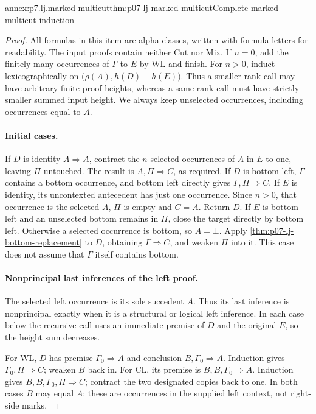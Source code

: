 \begin{annexitem}{annex:p7.lj.marked-multicut}{thm:p07-lj-marked-multicut}{Complete marked-multicut induction}
\begin{proof}
All formulas in this item are alpha-classes, written with formula letters
for readability.  The input proofs contain neither Cut nor Mix.  If
\(n=0\), add the finitely many occurrences of \(\Gamma\) to \(E\)
by WL and finish.  For \(n>0\), induct lexicographically on
\(\bigl(\rho(A),h(D)+h(E)\bigr)\).  Thus a smaller-rank call may
have arbitrary finite proof heights, whereas a same-rank call must have
strictly smaller summed input height.  We always keep unselected
occurrences, including occurrences equal to \(A\).

\paragraph{Initial cases.}
If \(D\) is identity \(A\Rightarrow A\), contract the \(n\)
selected occurrences of \(A\) in \(E\) to one, leaving \(\Pi\)
untouched.  The result is \(A,\Pi\Rightarrow C\), as required.
If \(D\) is bottom left, \(\Gamma\) contains a bottom occurrence,
and bottom left directly gives \(\Gamma,\Pi\Rightarrow C\).
If \(E\) is identity, its uncontexted antecedent has just one
occurrence.  Since \(n>0\), that occurrence is the selected \(A\),
\(\Pi\) is empty and \(C=A\).  Return \(D\).
If \(E\) is bottom left and an unselected bottom remains in
\(\Pi\), close the target directly by bottom left.  Otherwise a
selected occurrence is bottom, so \(A=\bot\).  Apply
\ref{thm:p07-lj-bottom-replacement} to \(D\), obtaining
\(\Gamma\Rightarrow C\), and weaken \(\Pi\) into it.
This case does not assume that \(\Gamma\) itself contains bottom.

\paragraph{Nonprincipal last inferences of the left proof.}
The selected left occurrence is its sole succedent \(A\).  Thus its
last inference is nonprincipal exactly when it is a structural or logical
left inference.  In each case below the recursive call uses an immediate
premise of \(D\) and the original \(E\), so the height sum decreases.

For WL, \(D\) has premise \(\Gamma_0\Rightarrow A\) and
conclusion \(B,\Gamma_0\Rightarrow A\).  Induction gives
\(\Gamma_0,\Pi\Rightarrow C\); weaken \(B\) back in.
For CL, its premise is \(B,B,\Gamma_0\Rightarrow A\).  Induction
gives \(B,B,\Gamma_0,\Pi\Rightarrow C\); contract the two
designated copies back to one.  In both cases \(B\) may equal \(A\):
these are occurrences in the supplied left context, not right-side marks.


\end{proof}
\end{annexitem}
